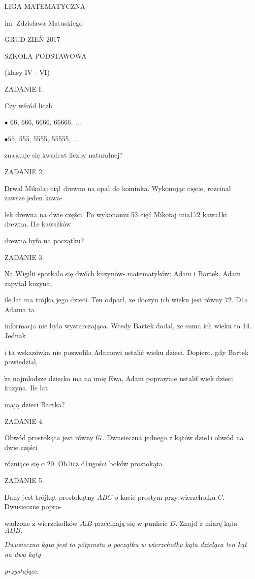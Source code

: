 \documentclass[a4paper,12pt]{article}
\begin{document}
LIGA MATEMATYCZNA

im. Zdzisława Matuskiego

GRUD Z$\mathrm{I}\mathrm{E}\acute{\mathrm{N}}$ 2017

SZKOLA PODSTAWOWA

(klasy IV - VI)

ZADANIE I.

Czy wśród liczb

$\bullet$ 66, 666, 6666, 66666, $\ldots$

$\bullet 55$, 555, 5555, 55555, $\ldots$

znajduje się kwadrat liczby naturalnej?

ZADANIE 2.

Drwal Mikołaj ciął drewno na opał do kominka. Wykonując cięcie, rozcinał zawsze jeden kawa-

lek drewna na dwie części. Po wykonaniu 53 cięć Mikofaj mia172 kawa1ki drewna. I1e kawałków

drewna byfo na początku?

ZADANIE 3.

Na Wigilii spotkalo się dwóch kuzynów- matematyków: Adam i Bartek. Adam zapytal kuzyna,

ile lat ma trójka jego dzieci. Ten odparł, $\dot{\mathrm{z}}\mathrm{e}$ iloczyn ich wieku jest równy 72. D1a Adama ta

informacja nie byla wystarczająca. Wtedy Bartek dodal, $\dot{\mathrm{z}}\mathrm{e}$ suma ich wieku to 14. Jednak

i ta wskazówka nie pozwolila Adamowi ustalić wieku dzieci. Dopiero, gdy Bartek powiedzial,

$\dot{\mathrm{z}}\mathrm{e}$ najmlodsze dziecko ma na imię Ewa, Adam poprawnie ustalif wiek dzieci kuzyna. Ile lat

mają dzieci Bartka?

ZADANIE 4.

Obwód prostokąta jest równy 67. Dwusieczna jednego z kątów dzie1i obwód na dwie części

rózniące się o 20. Ob1icz d1ugości boków prostokąta.

ZADANIE 5.

Dany jest trójkąt prostokątny $ABC$ o kącie prostym przy wierzcholku $C$. Dwusieczne popro-

wadzone z wierzchołków $A\mathrm{i}B$ przecinają się w punkcie $D.$ Znajd $\acute{\mathrm{z}}$ miarę kąta $ADB.$

{\it Dwusieczna kąta jest to pótprosta o początku w wierzchotku kąta dzieląca ten kąt na dwa kąty}

{\it przystajqce}.
\end{document}
